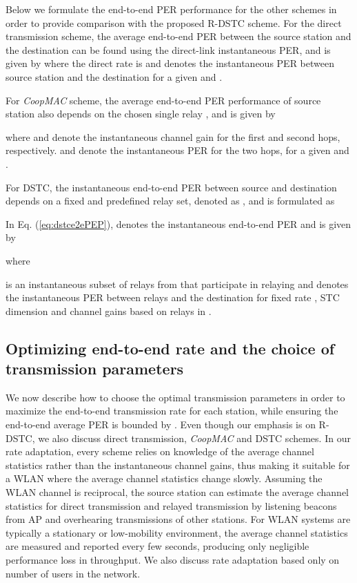 \documentclass[peerreview,draftcls,onecolumn,12pt,a4paper]{IEEEtran}
\begin{document}
Below we formulate the end-to-end PER performance for the other
schemes in order to provide comparison with the proposed R-DSTC scheme.
For the direct transmission scheme, the average end-to-end PER
between the source station  and the destination can be found
using the direct-link instantaneous PER, and is given by
 where the direct rate is  and  denotes the
instantaneous PER between source station  and the destination
for a given  and .

For \emph{CoopMAC} scheme, the average end-to-end PER performance
of source station  also depends on the chosen single relay ,
 and is given by

where  and  denote the instantaneous channel gain
for the first and second hops, respectively.  and  denote the instantaneous
PER for the two hops, for a given  and .

For DSTC, the instantaneous end-to-end PER between source  and destination  depends
on a fixed and predefined relay set, denoted as ,
and is formulated as


In Eq. (\ref{eq:dstce2ePEP}),  denotes
the instantaneous end-to-end PER and is given by

where

 is an instantaneous subset of relays from
 that participate in relaying and  denotes the
instantaneous PER  between relays and the destination for fixed
rate , STC dimension  and channel gains 
based on relays in .


\subsection{Optimizing end-to-end rate and the choice of transmission parameters}
We now describe how to choose the optimal transmission parameters
in order to maximize the end-to-end transmission rate for each
station, while ensuring the end-to-end average PER is bounded by
. Even though our emphasis is on R-DSTC, we also discuss
direct transmission, \emph{CoopMAC} and DSTC schemes. In our rate
adaptation, every scheme relies on knowledge of the average
channel statistics rather than the instantaneous channel gains,
thus making it suitable for a WLAN where the average
channel statistics change slowly. Assuming the WLAN channel is
reciprocal, the source station can estimate the average channel
statistics for direct transmission and relayed transmission by
listening beacons from AP and overhearing transmissions of other
stations. For WLAN systems are typically a stationary
or low-mobility environment, the average channel statistics are
measured and reported every few seconds, producing only negligible
performance loss in throughput. We also discuss rate adaptation based only on number of users in the network.
\end{document}
